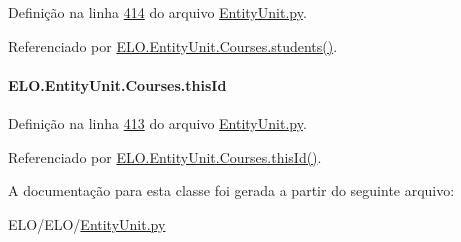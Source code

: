 Definição na linha \hyperlink{EntityUnit_8py_source_l00414}{414} do arquivo \hyperlink{EntityUnit_8py_source}{Entity\-Unit.\-py}.



Referenciado por \hyperlink{classELO_1_1EntityUnit_1_1Courses_ab1a0895decc2986339e0ab148922ad61}{E\-L\-O.\-Entity\-Unit.\-Courses.\-students()}.

\hypertarget{classELO_1_1EntityUnit_1_1Courses_a283b817d129a8d15e3bce56b368a169d}{
\paragraph[{this\-Id}]{\setlength{\rightskip}{0pt plus 5cm}E\-L\-O.\-Entity\-Unit.\-Courses.\-this\-Id}}\label{classELO_1_1EntityUnit_1_1Courses_a283b817d129a8d15e3bce56b368a169d}


Definição na linha \hyperlink{EntityUnit_8py_source_l00413}{413} do arquivo \hyperlink{EntityUnit_8py_source}{Entity\-Unit.\-py}.



Referenciado por \hyperlink{classELO_1_1EntityUnit_1_1Courses_a079f341a80c13005aec8764266f5c2f2}{E\-L\-O.\-Entity\-Unit.\-Courses.\-this\-Id()}.



A documentação para esta classe foi gerada a partir do seguinte arquivo\-:\begin{DoxyCompactItemize}
\item 
E\-L\-O/\-E\-L\-O/\hyperlink{EntityUnit_8py}{Entity\-Unit.\-py}\end{DoxyCompactItemize}
